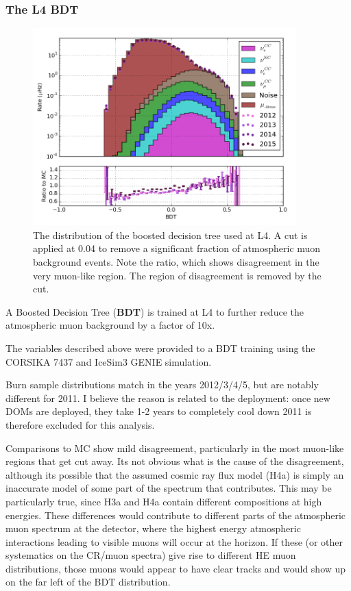 \subsubsection{The L4 BDT}
\begin{figure}[h]
	\centering
		\includegraphics[width=4in]{BDT_log.png}
		\caption[The L4 BDT Score]{The distribution of the boosted decision tree used at L4. A cut is applied at 0.04 to remove a significant fraction of atmospheric muon background events. Note the ratio, which shows disagreement in the very muon-like region. The region of disagreement is removed by the cut.}
	\label{fig:L4_bdt_log}
\end{figure}

A Boosted Decision Tree (\textbf{BDT}) is trained at L4 to further reduce the atmospheric muon background by a factor of 10x. 

The variables described above were provided to a BDT training using the CORSIKA 7437 and IceSim3 GENIE simulation. 

Burn sample distributions match in the years 2012/3/4/5, but are notably different for 2011. 
I believe the reason is related to the deployment: once new DOMs are deployed, they take 1-2 years to completely cool down 2011 is therefore excluded for this analysis.

Comparisons to MC show mild disagreement, particularly in the most muon-like regions that get cut away. 
Its not obvious what is the cause of the disagreement, although its possible that the assumed cosmic ray flux model (H4a) is simply an inaccurate model of some part of the spectrum that contributes. 
This may be particularly true, since H3a and H4a contain different compositions at high energies. 
These differences would contribute to different parts of the atmospheric muon spectrum at the detector, where the highest energy atmospheric interactions leading to visible muons will occur at the horizon. 
If these (or other systematics on the CR/muon spectra) give rise to different HE muon distributions, those muons would appear to have clear tracks and would show up on the far left of the BDT distribution.

